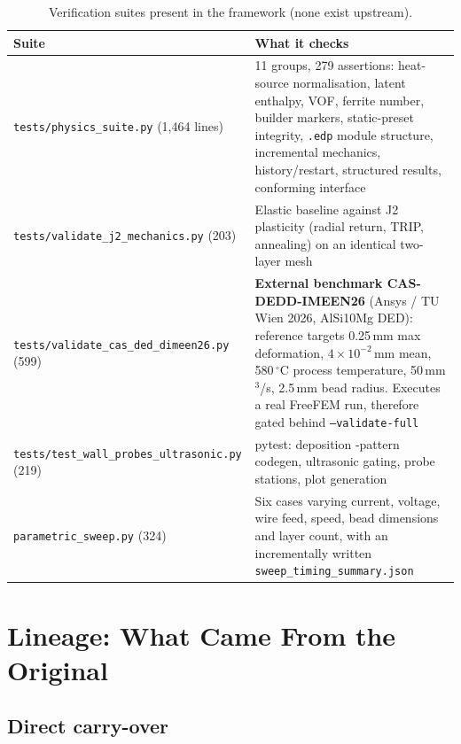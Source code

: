 \documentclass[10pt,a4paper]{article}
\newcommand{\code}[1]{\texttt{#1}}
\newcommand{\file}[1]{\texttt{\small #1}}
\begin{document}
\begin{table}[h!]
\centering
\caption{Verification suites present in the framework (none exist upstream).}
\label{tab:vv}
\small
\begin{tabularx}{\linewidth}{@{}l X@{}}
\toprule
\textbf{Suite} & \textbf{What it checks} \\
\midrule
\file{tests/physics\_suite.py} (1{,}464 lines) & 11 groups, 279 assertions:
heat-source normalisation, latent enthalpy, VOF, ferrite number, builder
markers, static-preset integrity, \code{.edp} module structure, incremental
mechanics, history/restart, structured results, conforming interface \\
\addlinespace
\file{tests/validate\_j2\_mechanics.py} (203) & Elastic baseline against J2
plasticity (radial return, TRIP, annealing) on an identical two-layer mesh \\
\addlinespace
\file{tests/validate\_cas\_ded\_dimeen26.py} (599) & \textbf{External
benchmark CAS-DEDD-IMEEN26} (Ansys / TU Wien 2026, AlSi10Mg DED): reference
targets 0.25\,mm max deformation, $4\times10^{-2}$\,mm mean, 580\,$^\circ$C
process temperature, 50\,mm$^3$/s, 2.5\,mm bead radius. Executes a real FreeFEM
run, therefore gated behind \code{--validate-full} \\
\addlinespace
\file{tests/test\_wall\_probes\_ultrasonic.py} (219) & pytest: deposition
-pattern codegen, ultrasonic gating, probe stations, plot generation \\
\addlinespace
\file{parametric\_sweep.py} (324) & Six cases varying current, voltage, wire
feed, speed, bead dimensions and layer count, with an incrementally written
\code{sweep\_timing\_summary.json} \\
\bottomrule
\end{tabularx}
\end{table}

\section{Lineage: What Came From the Original}

\subsection{Direct carry-over}
\end{document}
